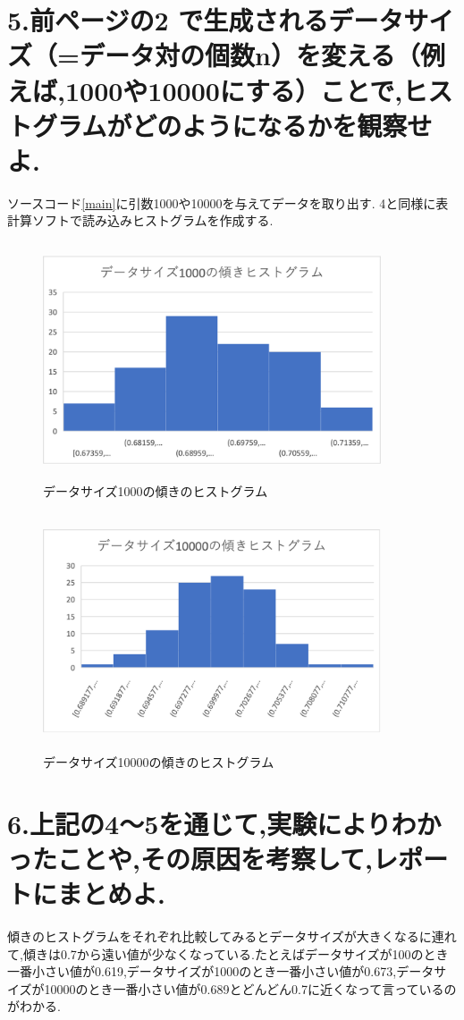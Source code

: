 \documentclass[a4j,10pt,dvipdfmx]{jarticle}
\begin{document}
\section{5.前ページの2 で生成されるデータサイズ（=データ対の個数n）を変える（例えば,1000や10000にする）ことで,ヒストグラムがどのようになるかを観察せよ.}
ソースコード\ref{main}に引数1000や10000を与えてデータを取り出す.
4と同様に表計算ソフトで読み込みヒストグラムを作成する.
\begin{figure}[H]
  \begin{center}
  \includegraphics[height=7cm,width=10cm]{2-2-1000.png}
  \caption{データサイズ1000の傾きのヒストグラム}
\end{center}
\end{figure}
\begin{figure}[H]
  \begin{center}
  \includegraphics[height=7cm,width=10cm]{2-2-10000.png}
  \caption{データサイズ10000の傾きのヒストグラム}
\end{center}
\end{figure}
\section{6.上記の4〜5を通じて,実験によりわかったことや,その原因を考察して,レポートにまとめよ.}
傾きのヒストグラムをそれぞれ比較してみるとデータサイズが大きくなるに連れて,傾きは0.7から遠い値が少なくなっている.たとえばデータサイズが100のとき一番小さい値が0.619,データサイズが1000のとき一番小さい値が0.673,データサイズが10000のとき一番小さい値が0.689とどんどん0.7に近くなって言っているのがわかる.
\end{document}

